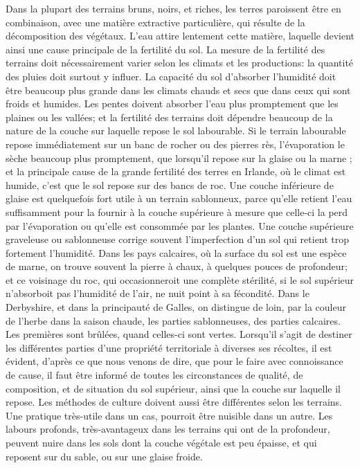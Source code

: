 Dans la plupart des terrains bruns, noirs, et riches, les terres paroissent être en combinaison, avec une matière extractive particulière, qui résulte de la décomposition des végétaux. L'eau attire lentement cette matière, laquelle devient ainsi une cause principale de la fertilité du sol.
La mesure de la fertilité des terrains doit nécessairement varier selon les climats et les productions: la quantité des pluies doit surtout y influer.
La capacité du sol d'absorber l'humidité doit être beaucoup plus grande dans les climats chauds et secs que dans ceux qui sont froids et humides. Les pentes doivent absorber l'eau plus promptement que les plaines ou les vallées; et la fertilité des terrains doit dépendre beaucoup de la nature de la couche sur laquelle repose le sol labourable.
Si le terrain labourable repose immédiatement sur un banc de rocher ou des pierres\setcounter{page}{465} rès, l'évaporation le sèche beaucoup plus promptement, que lorsqu'il repose sur la glaise ou la marne ; et la principale cause de la grande fertilité des terres en Irlande, où le climat est humide, c'est que le sol repose sur des bancs de roc.
Une couche inférieure de glaise est quelquefois fort utile à un terrain sablonneux, parce qu'elle retient l'eau suffisamment pour la fournir à la couche supérieure à mesure que celle-ci la perd par l'évaporation ou qu'elle est consommée par les plantes.
Une couche supérieure graveleuse ou sablonneuse corrige souvent l'imperfection d'un sol qui retient trop fortement l'humidité.
Dans les pays calcaires, où la surface du sol est une espèce de marne, on trouve souvent la pierre à chaux, à quelques pouces de profondeur; et ce voisinage du roc, qui occasionneroit une complète stérilité, si le sol supérieur n'absorboit pas l'humidité de l'air, ne nuit point à sa fécondité. Dans le Derbyshire, et dans la principauté de Galles, on distingue de loin, par la couleur de l'herbe dans la saison chaude, les parties sablonneuses, des parties calcaires. Les premières sont brûlées, quand celles-ci sont vertes.
Lorsqu'il s'agit de destiner les différentes parties d'une propriété territoriale à diverses\setcounter{page}{466} ses récoltes, il est évident, d'après ce que nous venons de dire, que pour le faire avec connoissance de cause, il faut être informé de toutes les circonstances de qualité, de composition, et de situation du sol supérieur, ainsi que la couche sur laquelle il repose.
Les méthodes de culture doivent aussi être différentes selon les terrains. Une pratique très-utile dans un cas, pourroit être nuisible dans un autre. Les labours profonds, très-avantageux dans les terrains qui ont de la profondeur, peuvent nuire dans les sols dont la couche végétale est peu épaisse, et qui reposent sur du sable, ou sur une glaise froide.

